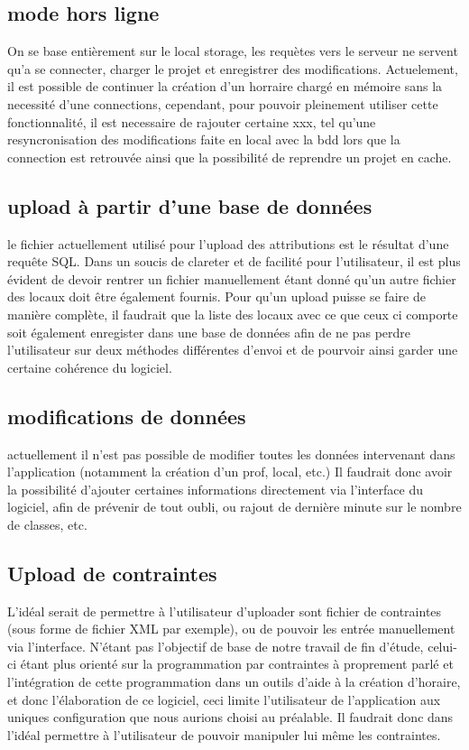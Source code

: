 \subsection{mode hors ligne}
On se base entièrement sur le local storage, les requètes vers le serveur ne
servent qu'a se connecter, charger le projet et enregistrer des modifications.
Actuelement, il est possible de continuer la création d'un horraire chargé en
mémoire sans la necessité d'une connections, cependant, pour pouvoir pleinement
utiliser cette fonctionnalité, il est necessaire de rajouter certaine xxx, tel
qu'une resyncronisation des modifications faite en local avec la bdd lors que la
connection est retrouvée ainsi que la possibilité de reprendre un projet en
cache.
\subsection{upload à partir d'une base de données}
le fichier actuellement utilisé pour l'upload des attributions est le résultat d'une requête SQL. Dans un soucis de clareter et de facilité pour l'utilisateur, il est plus évident de devoir rentrer un fichier manuellement étant donné qu'un autre fichier des locaux doit être également fournis. Pour qu'un upload puisse se faire de manière complète, il faudrait que la liste des locaux avec ce que ceux ci comporte soit également enregister dans une base de données afin de ne pas perdre l'utilisateur sur deux méthodes différentes d'envoi et de pourvoir ainsi garder une certaine cohérence du logiciel.
\subsection{modifications de données}
actuellement il n'est pas possible de modifier toutes les données intervenant
dans l'application (notamment la création d'un prof, local, etc.) Il faudrait donc avoir la possibilité d'ajouter certaines informations directement via l'interface du logiciel, afin de prévenir de tout oubli, ou rajout de dernière minute sur le nombre de classes, etc.

\subsection{Upload de contraintes}
L'idéal serait de permettre à l'utilisateur d'uploader sont fichier de contraintes (sous forme de fichier XML par exemple), ou de pouvoir les entrée manuellement via l'interface. N'étant pas l'objectif de base de notre travail de fin d'étude, celui-ci étant plus orienté sur la programmation par contraintes à proprement parlé et l'intégration de cette programmation dans un outils d'aide à la création d'horaire, et donc l'élaboration de ce logiciel, ceci limite l'utilisateur de l'application aux uniques configuration que nous aurions choisi au préalable. Il faudrait donc dans l'idéal permettre à l'utilisateur de pouvoir manipuler lui même les contraintes.